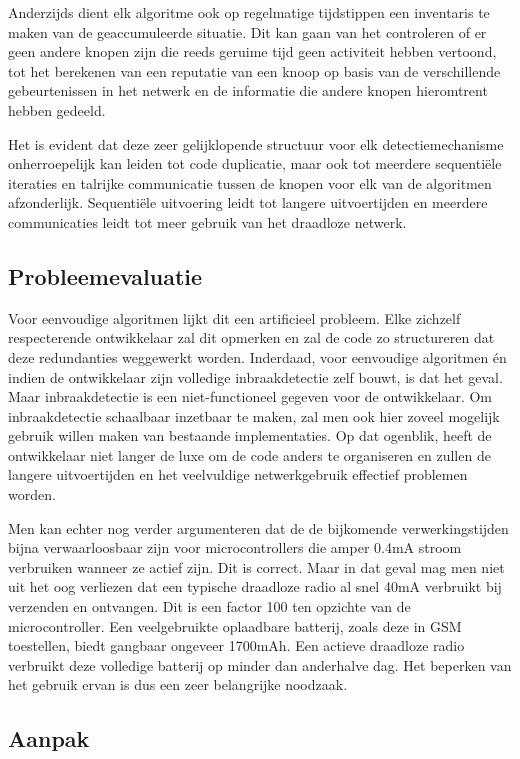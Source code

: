 \documentclass[12pt,a4paper,draft]{article}
\begin{document}
Anderzijds dient elk algoritme ook op regelmatige tijdstippen een inventaris te
maken van de geaccumuleerde situatie. Dit kan gaan van het controleren of er
geen andere knopen zijn die reeds geruime tijd geen activiteit hebben vertoond,
tot het berekenen van een reputatie van een knoop op basis van de verschillende
gebeurtenissen in het netwerk en de informatie die andere knopen hieromtrent
hebben gedeeld.

Het is evident dat deze zeer gelijklopende structuur voor elk
detectiemechanisme onherroepelijk kan leiden tot code duplicatie, maar ook tot
meerdere sequenti\"ele iteraties en talrijke communicatie tussen de knopen voor
elk van de algoritmen afzonderlijk. Sequenti\"ele uitvoering leidt tot langere
uitvoertijden en meerdere communicaties leidt tot meer gebruik van het
draadloze netwerk.

\subsection*{Probleemevaluatie}

Voor eenvoudige algoritmen lijkt dit een artificieel probleem. Elke zichzelf
respecterende ontwikkelaar zal dit opmerken en zal de code zo structureren dat
deze redundanties weggewerkt worden. Inderdaad, voor eenvoudige algoritmen \'en
indien de ontwikkelaar zijn volledige inbraakdetectie zelf bouwt, is dat het
geval. Maar inbraakdetectie is een niet-functioneel gegeven voor de
ontwikkelaar. Om inbraakdetectie schaalbaar inzetbaar te maken, zal men ook
hier zoveel mogelijk gebruik willen maken van bestaande implementaties. Op dat
ogenblik, heeft de ontwikkelaar niet langer de luxe om de code anders te
organiseren en zullen de langere uitvoertijden en het veelvuldige
netwerkgebruik effectief problemen worden.

Men kan echter nog verder argumenteren dat de de bijkomende verwerkingstijden
bijna verwaarloosbaar zijn voor microcontrollers die amper 0.4mA stroom
verbruiken wanneer ze actief zijn. Dit is correct. Maar in dat geval mag men
niet uit het oog verliezen dat een typische draadloze radio al snel 40mA
verbruikt bij verzenden en ontvangen. Dit is een factor 100 ten opzichte van de
microcontroller. Een veelgebruikte oplaadbare batterij, zoals deze in GSM
toestellen, biedt gangbaar ongeveer 1700mAh. Een actieve draadloze radio
verbruikt deze volledige batterij op minder dan anderhalve dag. Het beperken
van het gebruik ervan is dus een zeer belangrijke noodzaak.

\subsection*{Aanpak}
\end{document}
